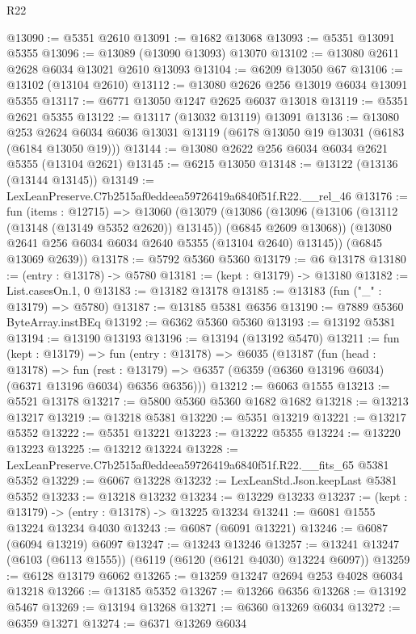 \begin{lexlean}{R22}
\begin{coremodule}
@13090 := @5351 @2610
@13091 := @1682 @13068
@13093 := @5351 @13091 @5355
@13096 := @13089 (@13090 @13093) @13070
@13102 := @13080 @2611 @2628 @6034 @13021 @2610 @13093
@13104 := @6209 @13050 @67
@13106 := @13102 (@13104 @2610)
@13112 := @13080 @2626 @256 @13019 @6034 @13091 @5355
@13117 := @6771 @13050 @1247 @2625 @6037 @13018
@13119 := @5351 @2621 @5355
@13122 := @13117 (@13032 @13119) @13091
@13136 := @13080
    @253
    @2624
    @6034
    @6036
    @13031
    @13119
    (@6178 @13050 @19 @13031 (@6183 (@6184 @13050 @19)))
@13144 := @13080 @2622 @256 @6034 @6034 @2621 @5355 (@13104 @2621)
@13145 := @6215 @13050
@13148 := @13122 (@13136 (@13144 @13145))
@13149 := LexLeanPreserve.C7b2515af0eddeea59726419a6840f51f.R22.__rel_46
@13176 := fun (items : @12715) =>
  @13060
    (@13079
      (@13086
        (@13096 (@13106 (@13112 (@13148 (@13149 @5352 @2620)) @13145)) (@6845 @2609 @13068))
        (@13080 @2641 @256 @6034 @6034 @2640 @5355 (@13104 @2640) @13145))
      (@6845 @13069 @2639))
@13178 := @5792 @5360 @5360
@13179 := @6 @13178
@13180 := (entry : @13178) -> @5780
@13181 := (kept : @13179) -> @13180
@13182 := List.casesOn.{1, 0}
@13183 := @13182 @13178
@13185 := @13183 (fun ("_" : @13179) => @5780)
@13187 := @13185 @5381 @6356
@13190 := @7889 @5360 ByteArray.instBEq
@13192 := @6362 @5360 @5360
@13193 := @13192 @5381
@13194 := @13190 @13193
@13196 := @13194 (@13192 @5470)
@13211 := fun (kept : @13179) =>
  fun (entry : @13178) =>
  @6035
    (@13187
      (fun (head : @13178) =>
      fun (rest : @13179) => @6357 (@6359 (@6360 @13196 @6034) (@6371 @13196 @6034) @6356 @6356)))
@13212 := @6063 @1555
@13213 := @5521 @13178
@13217 := @5800 @5360 @5360 @1682 @1682
@13218 := @13213 @13217
@13219 := @13218 @5381
@13220 := @5351 @13219
@13221 := @13217 @5352
@13222 := @5351 @13221
@13223 := @13222 @5355
@13224 := @13220 @13223
@13225 := @13212 @13224
@13228 := LexLeanPreserve.C7b2515af0eddeea59726419a6840f51f.R22.__fits_65 @5381 @5352
@13229 := @6067 @13228
@13232 := LexLeanStd.Json.keepLast @5381 @5352
@13233 := @13218 @13232
@13234 := @13229 @13233
@13237 := (kept : @13179) -> (entry : @13178) -> @13225 @13234
@13241 := @6081 @1555 @13224 @13234 @4030
@13243 := @6087 (@6091 @13221)
@13246 := @6087 (@6094 @13219) @6097
@13247 := @13243 @13246
@13257 := @13241 @13247 (@6103 (@6113 @1555)) (@6119 (@6120 (@6121 @4030) @13224 @6097))
@13259 := @6128 @13179 @6062
@13265 := @13259 @13247 @2694 @253 @4028 @6034 @13218
@13266 := @13185 @5352
@13267 := @13266 @6356
@13268 := @13192 @5467
@13269 := @13194 @13268
@13271 := @6360 @13269 @6034
@13272 := @6359 @13271
@13274 := @6371 @13269 @6034

\end{coremodule}
\end{lexlean}
